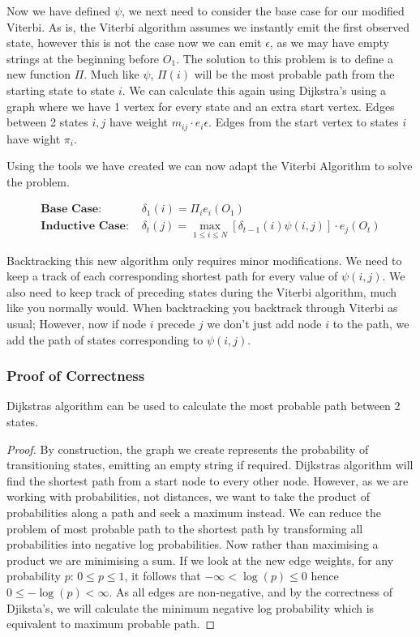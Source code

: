 Now we have defined $\psi$, we next need to consider the base case for our modified Viterbi.
As is, the Viterbi algorithm assumes we instantly emit the first observed state, however this is not the case now we can emit $\epsilon$, as we may have empty strings at the beginning before $O_1$. 
The solution to this problem is to define a new function $\Pi$. 
Much like $\psi$, $\Pi(i)$ will be the most probable path from the starting state to state $i$. 
We can calculate this again using Dijkstra's using a graph where we have 1 vertex for every state and an extra start vertex.
Edges between 2 states $i,j$ have weight $m_{ij}\cdot e_i{\epsilon}$. Edges from the start vertex to states $i$ have wight $\pi_i$.

Using the tools we have created we can now adapt the Viterbi Algorithm to solve the problem.


\begin{align*}
    \textbf{Base Case: } &\delta_1(i) = \Pi_i e_i(O_1)\\
    \textbf{Inductive Case: } &\delta_t(j) = \max_{1\leq i \leq N}[\delta_{t-1}(i)\psi(i,j)]\cdot e_j(O_t)
\end{align*}

Backtracking this new algorithm only requires minor modifications. 
We need to keep a track of each corresponding shortest path for every value of $\psi(i,j)$.
We also need to keep track of preceding states during the Viterbi algorithm, much like you normally would.
When backtracking you backtrack through Viterbi as usual; However, now if node $i$ precede $j$ we don't just add node $i$ to the path, we add the path of states corresponding to $\psi(i,j)$.

\subsubsection*{Proof of Correctness}


\begin{lemma}
    \label{prb:djPath}
    Dijkstras algorithm can be used to calculate the most probable path between 2 states.
\end{lemma}
\begin{proof}
    By construction, the graph we create represents the probability of transitioning states, emitting an empty string if required. 
    Dijkstras algorithm will find the shortest path from a start node to every other node. 
    However, as we are working with probabilities, not distances, we want to take the product of probabilities along a path and seek a maximum instead.
    We can reduce the problem of most probable path to the shortest path by transforming all probabilities into negative log probabilities. Now rather than maximising a product we are minimising a sum.
    If we look at the new edge weights, for any probability $p$: $0 \leq p \leq 1$, it follows that $-\infty < \log(p) \leq 0$ hence $0 \leq -\log(p) < \infty$.
    As all edges are non-negative, and by the correctness of Djiksta's, we will calculate the minimum negative log probability which is equivalent to maximum probable path.
\end{proof}

